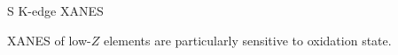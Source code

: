 \begin{slide}{S K-edge XANES}

  \begin{cenpage}{99mm}
    {}

    XANES of low-$Z$ elements are particularly sensitive to oxidation
    state.
  \end{cenpage}



\end{slide}

